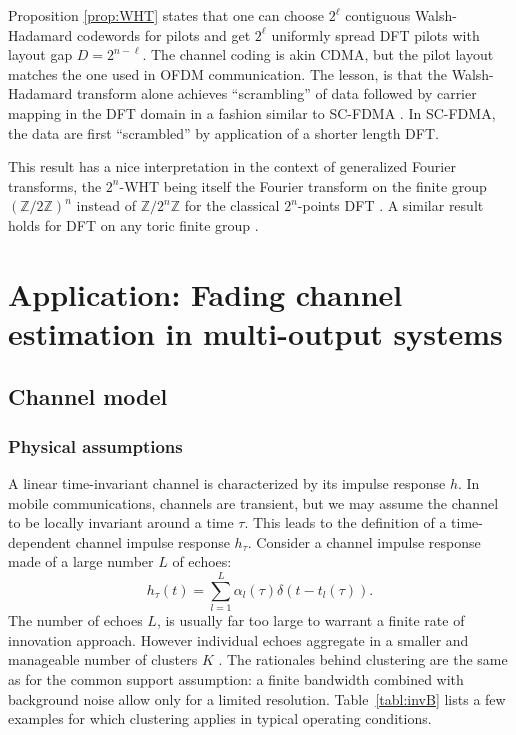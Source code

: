 \documentclass[journal,10pt]{IEEEtran}
\providecommand{\Zspace}{\mathbb{Z}}
\begin{document}
Proposition \ref{prop:WHT} states that one can choose $2^\ell$ contiguous Walsh-Hadamard codewords for pilots and get $2^\ell$ uniformly spread DFT pilots with layout gap $D=2^{n-\ell}$. The channel coding is akin CDMA, but the pilot layout matches the one used in OFDM communication. The lesson, is that the Walsh-Hadamard transform alone achieves ``scrambling'' of data followed by carrier mapping in the DFT domain in a fashion similar to SC-FDMA \cite{Myung2007}. In SC-FDMA, the data are first ``scrambled'' by application of a shorter length DFT.


This result  has a nice interpretation in the context of generalized Fourier transforms, the $2^n$-WHT being itself the Fourier transform on the finite group $(\Zspace/2\Zspace)^n$ instead of $\Zspace/2^n\Zspace$ for the classical $2^n$-points DFT \cite{Barbotin2010,Terras1999}. A similar result holds for DFT on any toric finite group \cite{Barbotin2010}.
 

\section{Application: Fading channel estimation in multi-output systems}\label{sec:application}
\subsection{Channel model}
\subsubsection{Physical assumptions}
	A linear time-invariant channel is characterized by its impulse response $h$. In mobile communications, channels are transient, but we may assume the channel to be locally invariant around a time $\tau$. This leads to the definition of a time-dependent channel impulse response $h_\tau$. Consider a channel impulse response made of a large number $L$ of echoes:
	\begin{equation}\label{eq:echoChannel}
	h_\tau(t)=\sum_{l=1}^L \alpha_l(\tau)\delta(t-t_l(\tau)).
	\end{equation} 
	The number of echoes $L$, is usually far too large to warrant a finite rate of innovation approach. However individual echoes aggregate in a smaller and manageable number of clusters $K$ \cite{Turin1956}. The rationales behind clustering are the same as for the common support assumption: a finite bandwidth combined with background noise allow only for a limited resolution. Table~\ref{tabl:invB} lists a few examples for which clustering applies in typical operating conditions.
\end{document}
